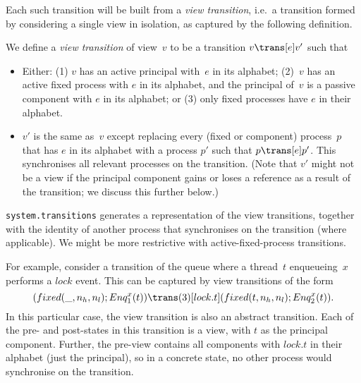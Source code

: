 Each such transition will be built from a \emph{view transition}, i.e.~a
transition formed by considering a single view in isolation, as captured by
the following definition.
%
\begin{definition}
We define a \emph{view transition} of view~$v$ to be a transition $v \trans[e]
v'$ such that
%
\begin{itemize}
\item Either: (1) $v$ has an active principal with~$e$ in its alphabet; (2)~$v$
  has an active fixed process with $e$ in its alphabet, and the principal
  of~$v$ is a passive component with $e$ in its alphabet; or (3) only fixed
  processes have $e$ in their alphabet.

\item $v'$ is the same as~$v$ except replacing every (fixed or component)
  process~$p$ that has $e$ in its alphabet with a process $p'$ such that \( p
  \trans[e] p' \).  This synchronises all relevant processes on the
  transition. (Note that $v'$ might not be a view if the principal component
  gains or loses a reference as a result of the transition; we discuss this
  further below.)
\end{itemize}
\end{definition}

\begin{impNote}
\texttt{system.transitions} generates a representation of the view
  transitions, together with the identity of another process that synchronises
  on the transition (where applicable).  We might be more restrictive with
  active-fixed-process transitions. 
\end{impNote}

For example, consider a transition of the queue where a thread~$t$
enqueueing~$x$ performs a $lock$ event.  This can be captured by view
transitions of the form
%
\begin{equation}
(fixed(\_, n_h, n_l); Enq^x_1(t))  \trans(3)[lock.t]
  (fixed(t, n_h, n_l); Enq^x_2(t)) .
\label{trans:lock}
\end{equation}
%
%
In this particular case, the view transition is also an abstract transition.
Each of the pre- and post-states in this transition is a view, with $t$ as the
principal component.  Further, the pre-view contains all components with
$lock.t$ in their alphabet (just the principal), so in a concrete state, no
other process would synchronise on the transition.

